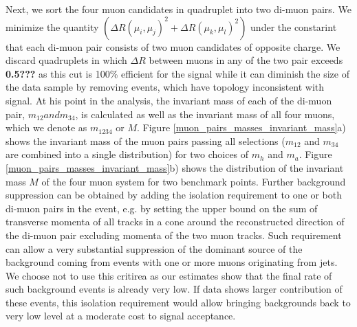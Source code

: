 \documentclass[aps,12pt,superscriptaddress,nofootinbib,floatfix,showpacs]{revtex4}
\begin{document}
Next, we sort the four muon candidates in quadruplet into two di-muon pairs. We minimize the quantity 
$(\Delta R(\mu_i,\mu_j)^2 + \Delta R (\mu_k,\mu_l)^2)$ under the constarint that each di-muon pair
consists of two muon candidates of opposite charge. We discard quadruplets in which $\Delta R$ between 
muons in any of the two pair exceeds {\bf 0.5???} as this cut is 100\% efficient for the signal while
it can diminish the size of the data sample by removing events, which have topology inconsistent with
signal. At his point in the analysis, the invariant mass of each of the di-muon pair, $m_{12} and m_{34}$, 
is calculated as well as the invariant mass of all four muons, which we denote as $m_{1234}$ or $M$. 
Figure \ref{muon_pairs_masses_invariant_mass}a) shows the invariant mass of the muon pairs passing 
all selections ($m_{12}$ and $m_{34}$ are combined into a single distribution) for two choices of
$m_h$ and $m_a$. Figure \ref{muon_pairs_masses_invariant_mass}b) shows the distribution of the invariant
mass $M$ of the four muon system for two benchmark points. Further background suppression can be
obtained by adding the isolation requirement to one or both di-muon pairs in the event, e.g. by
setting the upper bound on the sum of transverse momenta of all tracks in a cone around the reconstructed
direction of the di-muon pair excluding momenta of the two muon tracks. Such requirement can allow a 
very substantial suppression of the dominant source of the background coming from events with one or more 
muons originating from jets. We choose not to use this critirea as our estimates show that the final rate 
of such background events is already very low. If data shows larger contribution of these events, 
this isolation requirement would allow bringing backgrounds back to very low level at a moderate
cost to signal acceptance.
\end{document}
